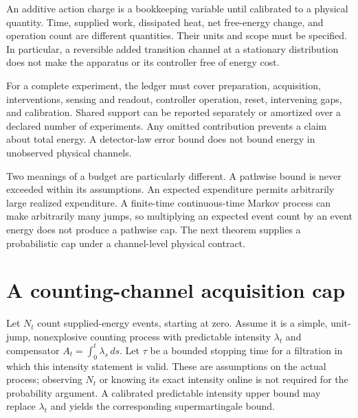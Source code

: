An additive action charge is a bookkeeping variable until calibrated to a
physical quantity. Time, supplied work, dissipated heat, net free-energy change,
and operation count are different quantities. Their units and scope must be
specified. In particular, a reversible added transition channel at a stationary
distribution does not make the apparatus or its controller free of energy cost.

For a complete experiment, the ledger must cover preparation, acquisition,
interventions, sensing and readout, controller operation, reset, intervening
gaps, and calibration. Shared support can be reported separately or amortized
over a declared number of experiments. Any omitted contribution prevents a
claim about total energy. A detector-law error bound does not bound energy in
unobserved physical channels.

Two meanings of a budget are particularly different. A pathwise bound is never
exceeded within its assumptions. An expected expenditure permits arbitrarily
large realized expenditure. A finite-time continuous-time Markov process can
make arbitrarily many jumps, so multiplying an expected event count by an
event energy does not produce a pathwise cap. The next theorem supplies a
probabilistic cap under a channel-level physical contract.

\section{A counting-channel acquisition cap}

Let $N_t$ count supplied-energy events, starting at zero. Assume it is a simple,
unit-jump, nonexplosive counting process with predictable intensity $\lambda_t$
and compensator
$A_t=\int_0^t\lambda_s\,ds$. Let $\tau$ be a bounded stopping time for a
filtration in which this intensity statement is valid. These are assumptions
on the actual process; observing $N_t$ or knowing its exact intensity online is
not required for the probability argument. A calibrated predictable intensity
upper bound may replace $\lambda_t$ and yields the corresponding
supermartingale bound.

